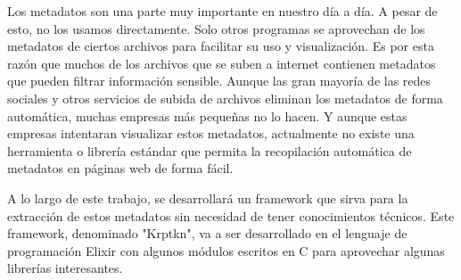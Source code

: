 Los metadatos son una parte muy importante en nuestro d\'ia a d\'ia. A pesar de esto, no los usamos directamente. Solo otros programas se aprovechan de los metadatos de ciertos archivos para facilitar su uso y visualizaci\'on. Es por esta raz\'on que muchos de los archivos que se suben a internet contienen metadatos que pueden filtrar informaci\'on sensible. Aunque las gran mayor\'ia de las redes sociales y otros servicios de subida de archivos eliminan los metadatos de forma autom\'atica, muchas empresas m\'as peque\~nas no lo hacen. Y aunque estas empresas intentaran visualizar estos metadatos, actualmente no existe una herramienta o librer\'ia est\'andar que permita la recopilaci\'on autom\'atica de metadatos en p\'aginas web de forma f\'acil.

A lo largo de este trabajo, se desarrollar\'a un framework que sirva para la extracci\'on de estos metadatos sin necesidad de tener conocimientos t\'ecnicos. Este framework, denominado "Krptkn", va a ser desarrollado en el lenguaje de programaci\'on Elixir con algunos m\'odulos escritos en C para aprovechar algunas librer\'ias interesantes.

